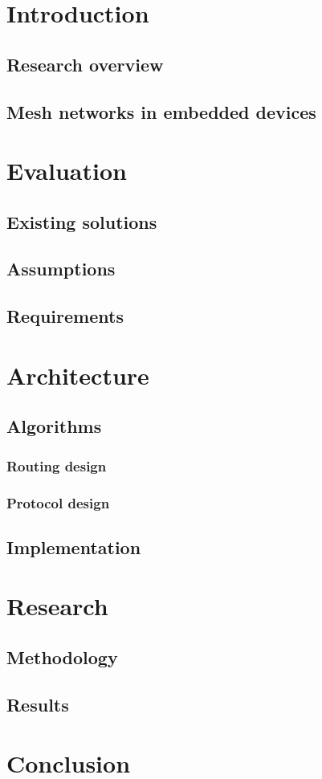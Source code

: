 \chapter{Introduction}

\section{Research overview}
\section{Mesh networks in embedded devices}

\chapter{Evaluation}
\section{Existing solutions}
\section{Assumptions}
\section{Requirements}

\chapter{Architecture}
\section{Algorithms}

\subsection{Routing design}
\subsection{Protocol design}

\section{Implementation}



\chapter{Research}
\section{Methodology}
\section{Results}

\chapter{Conclusion}

